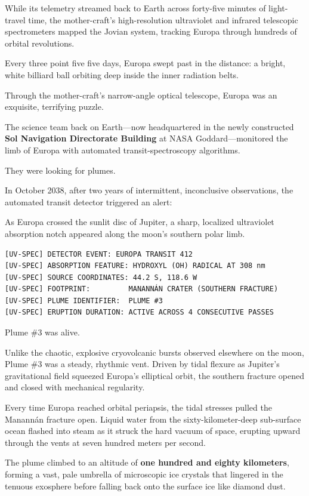 \documentclass[12pt,twoside,openright]{book}
\begin{document}
While its telemetry streamed back to Earth across forty-five minutes of
light-travel time, the mother-craft's high-resolution ultraviolet and
infrared telescopic spectrometers mapped the Jovian system, tracking
Europa through hundreds of orbital revolutions.

Every three point five five days, Europa swept past in the distance: a
bright, white billiard ball orbiting deep inside the inner radiation
belts.

Through the mother-craft's narrow-angle optical telescope, Europa was an
exquisite, terrifying puzzle.

The science team back on Earth---now headquartered in the newly
constructed \textbf{Sol Navigation Directorate Building} at NASA
Goddard---monitored the limb of Europa with automated
transit-spectroscopy algorithms.

They were looking for plumes.

In October 2038, after two years of intermittent, inconclusive
observations, the automated transit detector triggered an alert:

As Europa crossed the sunlit disc of Jupiter, a sharp, localized
ultraviolet absorption notch appeared along the moon's southern polar
limb.

\begin{lstlisting}
[UV-SPEC] DETECTOR EVENT: EUROPA TRANSIT 412
[UV-SPEC] ABSORPTION FEATURE: HYDROXYL (OH) RADICAL AT 308 nm
[UV-SPEC] SOURCE COORDINATES: 44.2 S, 118.6 W
[UV-SPEC] FOOTPRINT:         MANANNÁN CRATER (SOUTHERN FRACTURE)
[UV-SPEC] PLUME IDENTIFIER:  PLUME #3
[UV-SPEC] ERUPTION DURATION: ACTIVE ACROSS 4 CONSECUTIVE PASSES
\end{lstlisting}

Plume \#3 was alive.

Unlike the chaotic, explosive cryovolcanic bursts observed elsewhere on
the moon, Plume \#3 was a steady, rhythmic vent. Driven by tidal flexure
as Jupiter's gravitational field squeezed Europa's elliptical orbit, the
southern fracture opened and closed with mechanical regularity.

Every time Europa reached orbital periapsis, the tidal stresses pulled
the Manannán fracture open. Liquid water from the sixty-kilometer-deep
sub-surface ocean flashed into steam as it struck the hard vacuum of
space, erupting upward through the vents at seven hundred meters per
second.

The plume climbed to an altitude of \textbf{one hundred and eighty
kilometers}, forming a vast, pale umbrella of microscopic ice crystals
that lingered in the tenuous exosphere before falling back onto the
surface ice like diamond dust.
\end{document}
